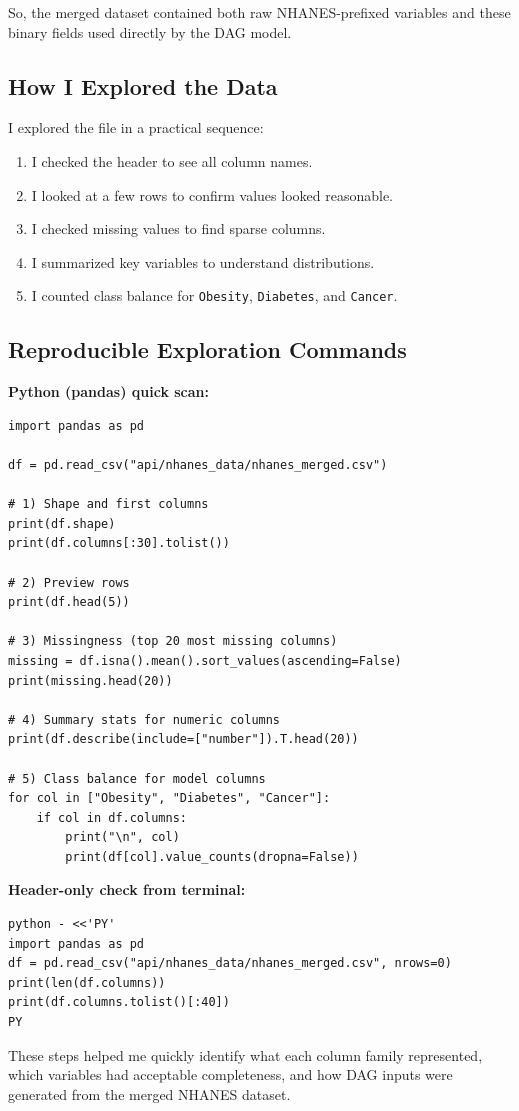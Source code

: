 \documentclass[12pt]{article}
\begin{document}
So, the merged dataset contained both raw NHANES-prefixed variables and these binary fields used directly by the DAG model.

\subsection{How I Explored the Data}

I explored the file in a practical sequence:
\begin{enumerate}
	\item I checked the header to see all column names.
	\item I looked at a few rows to confirm values looked reasonable.
	\item I checked missing values to find sparse columns.
	\item I summarized key variables to understand distributions.
	\item I counted class balance for \texttt{Obesity}, \texttt{Diabetes}, and \texttt{Cancer}.
\end{enumerate}

\subsection{Reproducible Exploration Commands}

\textbf{Python (pandas) quick scan:}

\begin{verbatim}
import pandas as pd

df = pd.read_csv("api/nhanes_data/nhanes_merged.csv")

# 1) Shape and first columns
print(df.shape)
print(df.columns[:30].tolist())

# 2) Preview rows
print(df.head(5))

# 3) Missingness (top 20 most missing columns)
missing = df.isna().mean().sort_values(ascending=False)
print(missing.head(20))

# 4) Summary stats for numeric columns
print(df.describe(include=["number"]).T.head(20))

# 5) Class balance for model columns
for col in ["Obesity", "Diabetes", "Cancer"]:
	if col in df.columns:
		print("\n", col)
		print(df[col].value_counts(dropna=False))
\end{verbatim}

\textbf{Header-only check from terminal:}

\begin{verbatim}
python - <<'PY'
import pandas as pd
df = pd.read_csv("api/nhanes_data/nhanes_merged.csv", nrows=0)
print(len(df.columns))
print(df.columns.tolist()[:40])
PY
\end{verbatim}

These steps helped me quickly identify what each column family represented,
which variables had acceptable completeness,
and how DAG inputs were generated from the merged NHANES dataset.
\end{document}
